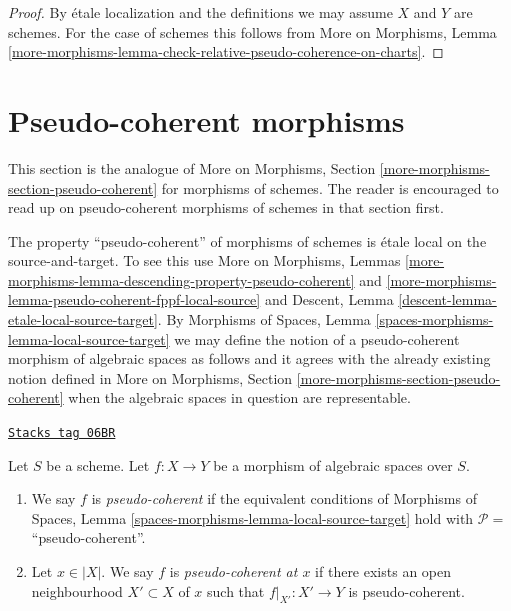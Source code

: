 \begin{proof}
By \'etale localization and the definitions we may assume
$X$ and $Y$ are schemes. For the case of schemes this follows
from More on Morphisms, Lemma
\ref{more-morphisms-lemma-check-relative-pseudo-coherence-on-charts}.
\end{proof}

\section{Pseudo-coherent morphisms}
\label{spaces-more-morphisms-section-pseudo-coherent}
This section is the analogue of
More on Morphisms, Section \ref{more-morphisms-section-pseudo-coherent}
for morphisms of schemes. The reader is encouraged to read up
on pseudo-coherent morphisms of schemes in that section first.

\medskip\noindent
The property ``pseudo-coherent'' of morphisms of schemes is
\'etale local on the source-and-target. To see this use
More on Morphisms,
Lemmas \ref{more-morphisms-lemma-descending-property-pseudo-coherent} and
\ref{more-morphisms-lemma-pseudo-coherent-fppf-local-source}
and
Descent, Lemma \ref{descent-lemma-etale-local-source-target}.
By
Morphisms of Spaces,
Lemma \ref{spaces-morphisms-lemma-local-source-target}
we may define the notion of a pseudo-coherent morphism of algebraic spaces as
follows and it agrees with the already existing notion defined in
More on Morphisms, Section \ref{more-morphisms-section-pseudo-coherent}
when the algebraic spaces in question are representable.

\begin{definition}
\label{spaces-more-morphisms-definition-pseudo-coherent}
\href{https://stacks.math.columbia.edu/tag/06BR}{\texttt{Stacks tag 06BR}}

Let $S$ be a scheme.
Let $f : X \to Y$ be a morphism of algebraic spaces over $S$.
\begin{enumerate}
\item We say $f$ is {\it pseudo-coherent} if the equivalent conditions of
Morphisms of Spaces, Lemma \ref{spaces-morphisms-lemma-local-source-target}
hold with $\mathcal{P} =$``pseudo-coherent''.
\item Let $x \in |X|$. We say $f$ is {\it pseudo-coherent at $x$} if
there exists an open neighbourhood $X' \subset X$ of $x$ such
that $f|_{X'} : X' \to Y$ is pseudo-coherent.
\end{enumerate}
\end{definition}

